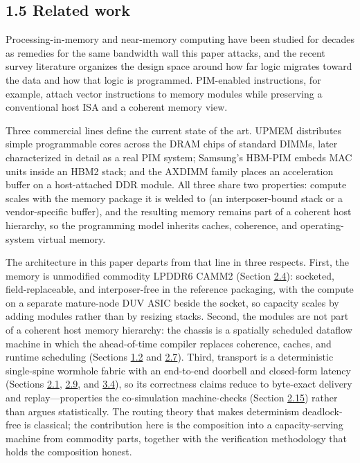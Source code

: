 \documentclass[10pt,twocolumn]{article}
\begin{document}
\subsection*{1.5 Related work}\label{sec:1.5}

Processing-in-memory and near-memory computing have been studied for decades as remedies for the same bandwidth wall this paper attacks\cite{1}, and the recent survey literature organizes the design space around how far logic migrates toward the data and how that logic is programmed\cite{35}. PIM-enabled instructions, for example, attach vector instructions to memory modules while preserving a conventional host ISA and a coherent memory view\cite{36}.

Three commercial lines define the current state of the art. UPMEM distributes simple programmable cores across the DRAM chips of standard DIMMs\cite{31}, later characterized in detail as a real PIM system\cite{37}; Samsung's HBM-PIM embeds MAC units inside an HBM2 stack\cite{32,33}; and the AXDIMM family places an acceleration buffer on a host-attached DDR module\cite{34}. All three share two properties: compute scales with the memory package it is welded to (an interposer-bound stack or a vendor-specific buffer), and the resulting memory remains part of a coherent host hierarchy, so the programming model inherits caches, coherence, and operating-system virtual memory.

The architecture in this paper departs from that line in three respects. First, the memory is unmodified commodity LPDDR6 CAMM2 (Section \hyperref[sec:2.4]{2.4}): socketed, field-replaceable, and interposer-free in the reference packaging, with the compute on a separate mature-node DUV ASIC beside the socket, so capacity scales by adding modules rather than by resizing stacks. Second, the modules are not part of a coherent host memory hierarchy: the chassis is a spatially scheduled dataflow machine in which the ahead-of-time compiler replaces coherence, caches, and runtime scheduling (Sections \hyperref[sec:1.2]{1.2} and \hyperref[sec:2.7]{2.7}). Third, transport is a deterministic single-spine wormhole fabric with an end-to-end doorbell and closed-form latency (Sections \hyperref[sec:2.1]{2.1}, \hyperref[sec:2.9]{2.9}, and \hyperref[sec:3.4]{3.4}), so its correctness claims reduce to byte-exact delivery and replay---properties the co-simulation machine-checks (Section \hyperref[sec:2.15]{2.15}) rather than argues statistically. The routing theory that makes determinism deadlock-free is classical\cite{13,14}; the contribution here is the composition into a capacity-serving machine from commodity parts, together with the verification methodology that holds the composition honest.
\end{document}
